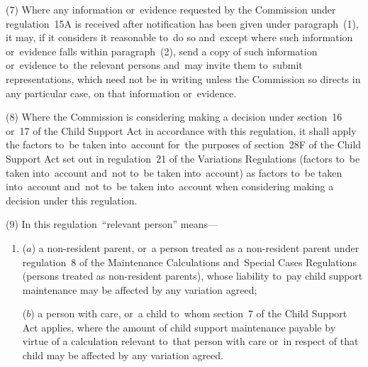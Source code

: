 \documentclass[12pt,a4paper]{article}
\begin{document}
{(7) Where any information or~evidence requested by the 
Commission  %
under regulation~15A is received after notification has been given under paragraph~(1), 
it  %
may, if 
it  %
considers it reasonable to~do so and~except where such information or~evidence falls within paragraph~(2), send a copy of such information or~evidence to~the relevant persons and~may invite them to~submit representations, which need not be in writing unless the 
Commission  %
so directs in any particular case, on that information or~evidence.

(8) Where the 
Commission  %
is considering making a decision under section~16 or~17 of the Child Support Act in accordance with this regulation, 
it  %
shall apply the factors to~be taken into~account for~the purposes of section~28F of the Child Support Act set out in regulation~21 of the Variations Regulations (factors to~be taken into~account and~not to~be taken into~account) as factors to~be taken into~account and~not to~be taken into~account when considering making a decision under this regulation.

(9) In this regulation~“relevant person” means—
\begin{enumerate}\item[]
($a$) a non-resident parent, or~a person treated as a non-resident parent under regulation~8 of the Maintenance Calculations and~Special Cases Regulations (persons treated as non-resident parents), whose liability to~pay child support maintenance may be affected by any variation agreed;

($b$) a person with care, or~a child to~whom section~7 of the Child Support Act applies, where the amount of child support maintenance payable by virtue of a calculation relevant to~that person with care or~in respect of that child may be affected by any variation agreed.
\end{enumerate}


}
\end{document}
